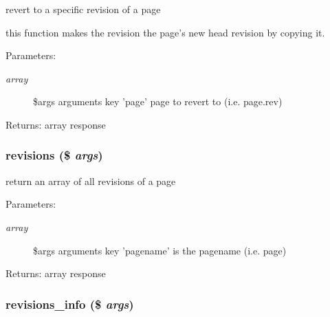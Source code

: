 revert to a specific revision of a page

this function makes the revision the page's new head revision by copying it. \begin{Desc}
\item[Parameters:]
\begin{description}
\item[{\em array}]\$args arguments key 'page' page to revert to (i.e. page.rev) \end{description}
\end{Desc}
\begin{Desc}
\item[Returns:]array response \end{Desc}
\hypertarget{module__glue_8inc_8php_27d90d2ed1b4142554bc4e0e47e9ba0c}{
\subsubsection[{revisions}]{\setlength{\rightskip}{0pt plus 5cm}revisions (\$ {\em args})}}
\label{module__glue_8inc_8php_27d90d2ed1b4142554bc4e0e47e9ba0c}


return an array of all revisions of a page

\begin{Desc}
\item[Parameters:]
\begin{description}
\item[{\em array}]\$args arguments key 'pagename' is the pagename (i.e. page) \end{description}
\end{Desc}
\begin{Desc}
\item[Returns:]array response \end{Desc}
\hypertarget{module__glue_8inc_8php_1dc65b69a920ac4ebc8f7c1df305060b}{
\subsubsection[{revisions\_\-info}]{\setlength{\rightskip}{0pt plus 5cm}revisions\_\-info (\$ {\em args})}}
\label{module__glue_8inc_8php_1dc65b69a920ac4ebc8f7c1df305060b}



